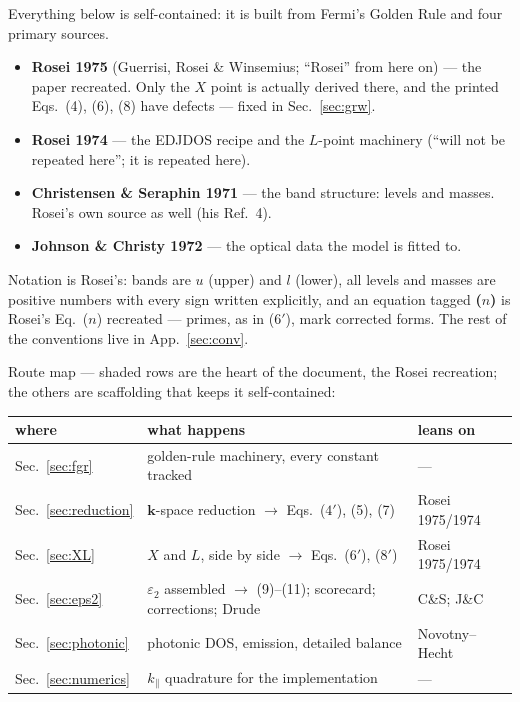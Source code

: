 \documentclass[11pt,a4paper]{article}
\numberwithin{equation}{section}
\begin{document}
Everything below is self-contained: it is built from Fermi's Golden
Rule and four primary sources.
\begin{itemize}
\item \textbf{Rosei 1975} (Guerrisi, Rosei \& Winsemius; ``Rosei'' from here on) --- the paper recreated.  Only the $X$ point is actually derived there, and the printed Eqs.~(4), (6), (8) have defects --- fixed in Sec.~\ref{sec:grw}.
\item \textbf{Rosei 1974} --- the EDJDOS recipe and the $L$-point machinery (``will not be repeated here''; it is repeated here).
\item \textbf{Christensen \& Seraphin 1971} --- the band structure: levels and masses.  Rosei's own source as well (his Ref.~4).
\item \textbf{Johnson \& Christy 1972} --- the optical data the model is fitted to.
\end{itemize}
Notation is Rosei's: bands are $u$ (upper) and $l$ (lower), all levels
and masses are positive numbers with every sign written explicitly,
and an equation tagged \textbf{($n$)} is Rosei's Eq.~($n$) recreated
--- primes, as in ($6'$), mark corrected forms.  The rest of the
conventions live in App.~\ref{sec:conv}.

\medskip
\noindent Route map --- shaded rows are the heart of the document, the
Rosei recreation; the others are scaffolding that keeps it
self-contained:

\begin{center}
\small
\renewcommand{\arraystretch}{1.3}
\begin{tabular}{@{}lll@{}}
\toprule
where & what happens & leans on \\
\midrule
Sec.~\ref{sec:fgr} & golden-rule machinery, every constant tracked & --- \\
\rowcolor{corerow}
Sec.~\ref{sec:reduction} & $\mathbf k$-space reduction $\to$ Eqs.~($4'$), (5), (7) & Rosei 1975/1974 \\
\rowcolor{corerow}
Sec.~\ref{sec:XL} & $X$ and $L$, side by side $\to$ Eqs.~($6'$), ($8'$) & Rosei 1975/1974 \\
\rowcolor{corerow}
Sec.~\ref{sec:eps2} & ${\varepsilon}_2$ assembled $\to$ (9)--(11); scorecard; corrections; Drude & C\&S; J\&C \\
Sec.~\ref{sec:photonic} & photonic DOS, emission, detailed balance & Novotny--Hecht \\
Sec.~\ref{sec:numerics} & ${k_{\parallel}}$ quadrature for the implementation & --- \\
\bottomrule
\end{tabular}\end{center}
\end{document}
